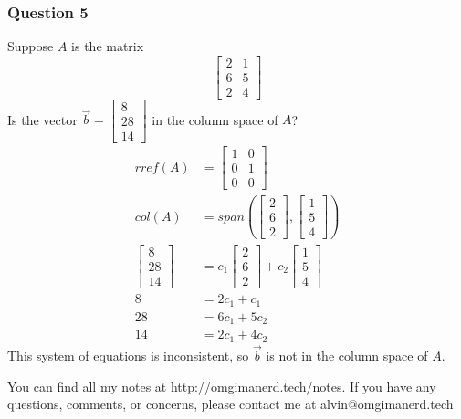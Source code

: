\documentclass{math}
\begin{document}
\subsubsection*{Question 5}
Suppose \( A \) is the matrix
\[ \begin{bmatrix}
  2 & 1 \\
  6 & 5 \\
  2 & 4
\end{bmatrix} \]
Is the vector \( \vec{b} = \begin{bmatrix}8 \\ 28 \\ 14\end{bmatrix} \) in
the column space of \( A \)?
\begin{align*}
  rref(A) &= \begin{bmatrix}
    1 & 0 \\
    0 & 1 \\
    0 & 0
  \end{bmatrix} \\
  col(A) &= span\left(\begin{bmatrix}2 \\ 6 \\ 2\end{bmatrix},
    \begin{bmatrix}1 \\ 5 \\ 4\end{bmatrix}\right) \\
  \begin{bmatrix}8 \\ 28 \\ 14\end{bmatrix} &=
    c_1\begin{bmatrix}2 \\ 6 \\ 2\end{bmatrix}+
    c_2\begin{bmatrix}1 \\ 5 \\ 4\end{bmatrix} \\
  8 &= 2c_1+c_1 \\
  28 &= 6c_1+5c_2 \\
  14 &= 2c_1+4c_2
\end{align*}
This system of equations is inconsistent, so \( \vec{b} \) is not in the
column space of \( A \).

\begin{center}
  You can find all my notes at \url{http://omgimanerd.tech/notes}. If you have
  any questions, comments, or concerns, please contact me at
  alvin@omgimanerd.tech
\end{center}
\end{document}
